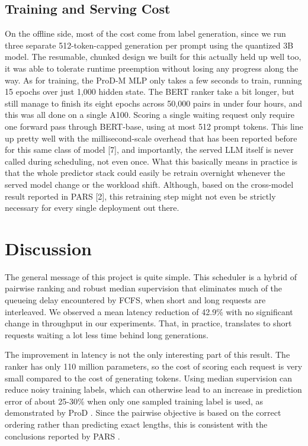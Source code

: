 \documentclass[conference]{IEEEtran}
\begin{document}
\subsection{Training and Serving Cost}
\label{sec:cost}
On the offline side, most of the cost come from label generation, since we run three separate 512-token-capped generation per prompt using the quantized 3B model. The resumable, chunked design we built for this actually held up
well too, it was able to tolerate runtime preemption without losing any progress along the way. As for training, the ProD-M MLP only takes a few seconds to train, running 15 epochs over just 1,000 hidden state. The BERT ranker take a bit longer, but still manage to finish its eight epochs across 50,000 pairs in under four hours, and this was all done on a single A100. Scoring a single waiting request only require one forward pass through BERT-base, using at most 512 prompt tokens. This line up pretty well with the millisecond-scale overhead that has been reported before for this same class of model [7], and importantly, the served LLM itself is never called during scheduling, not even once. What this basically means in practice is that the whole predictor stack could easily be retrain overnight whenever the served model change or the workload shift. Although, based on the cross-model result reported in PARS [2], this retraining step might not even be strictly necessary for every single
deployment out there. 

\section{Discussion}
\label{sec:discussion}
The general message of this project is quite simple. This scheduler is a hybrid of pairwise ranking and robust median supervision that eliminates much of the queueing delay encountered by FCFS, when short and long requests are interleaved. We observed a mean latency reduction of 42.9\% with no significant change in throughput in our experiments. That, in practice, translates to short requests waiting a lot less time behind long generations.

The improvement in latency is not the only interesting part of this result. The ranker has only 110 million parameters, so the cost of scoring each request is very small compared to the cost of generating tokens. Using median supervision can reduce noisy training labels, which can otherwise lead to an increase in prediction error of about 25-30\% when only one sampled training label is used, as demonstrated by ProD \cite{wang2026prodm}. Since the pairwise objective is based on the correct ordering rather than predicting exact lengths, this is consistent with the conclusions reported by PARS \cite{tao2025pars}.
\end{document}
